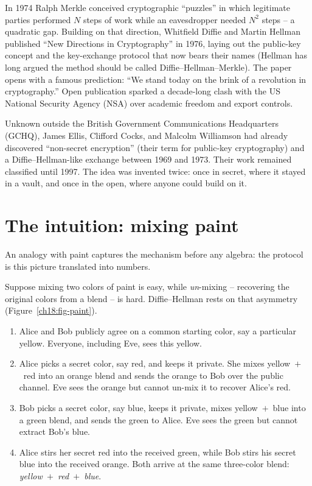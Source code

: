 \begin{historybox}
In 1974 Ralph Merkle conceived cryptographic ``puzzles'' in which legitimate parties performed $N$ steps of work while an eavesdropper needed $N^2$ steps -- a quadratic gap. Building on that direction, Whitfield Diffie and Martin Hellman published ``New Directions in Cryptography'' in 1976, laying out the public-key concept and the key-exchange protocol that now bears their names (Hellman has long argued the method should be called Diffie--Hellman--Merkle). The paper opens with a famous prediction: ``We stand today on the brink of a revolution in cryptography.'' Open publication sparked a decade-long clash with the US National Security Agency (NSA) over academic freedom and export controls.

Unknown outside the British Government Communications Headquarters (GCHQ), James Ellis, Clifford Cocks, and Malcolm Williamson had already discovered ``non-secret encryption'' (their term for public-key cryptography) and a Diffie--Hellman-like exchange between 1969 and 1973. Their work remained classified until 1997. The idea was invented twice: once in secret, where it stayed in a vault, and once in the open, where anyone could build on it.
\end{historybox}

\section{The intuition: mixing paint}
\label{ch18:paint}

An analogy with paint captures the mechanism before any algebra: the protocol is this picture translated into numbers.

Suppose mixing two colors of paint is easy, while \emph{un}-mixing -- recovering the original colors from a blend -- is hard. Diffie--Hellman rests on that asymmetry (Figure~\ref{ch18:fig-paint}).

\begin{enumerate}
  \item Alice and Bob publicly agree on a common starting color, say a particular yellow. Everyone, including Eve, sees this yellow.
  \item Alice picks a secret color, say red, and keeps it private. She mixes yellow~$+$~red into an orange blend and sends the orange to Bob over the public channel. Eve sees the orange but cannot un-mix it to recover Alice's red.
  \item Bob picks a secret color, say blue, keeps it private, mixes yellow~$+$~blue into a green blend, and sends the green to Alice. Eve sees the green but cannot extract Bob's blue.
  \item Alice stirs her secret red into the received green, while Bob stirs his secret blue into the received orange. Both arrive at the same three-color blend: \emph{yellow~$+$~red~$+$~blue}.
\end{enumerate}

